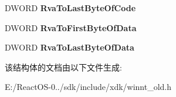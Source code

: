 \begin{DoxyCompactItemize}
D\+W\+O\+RD {\bfseries Rva\+To\+Last\+Byte\+Of\+Code}
\item 
\mbox{\label{struct___i_m_a_g_e___c_o_f_f___s_y_m_b_o_l_s___h_e_a_d_e_r_a6432a3ea59f6d6c61e65865f6390e19f}} 
D\+W\+O\+RD {\bfseries Rva\+To\+First\+Byte\+Of\+Data}
\item 
\mbox{\label{struct___i_m_a_g_e___c_o_f_f___s_y_m_b_o_l_s___h_e_a_d_e_r_a624863afce46da0229fcd1bd113be5bb}} 
D\+W\+O\+RD {\bfseries Rva\+To\+Last\+Byte\+Of\+Data}
\end{DoxyCompactItemize}


该结构体的文档由以下文件生成\+:\begin{DoxyCompactItemize}
\item 
E\+:/\+React\+O\+S-\/0../sdk/include/xdk/winnt\+\_\+old.\+h\end{DoxyCompactItemize}

